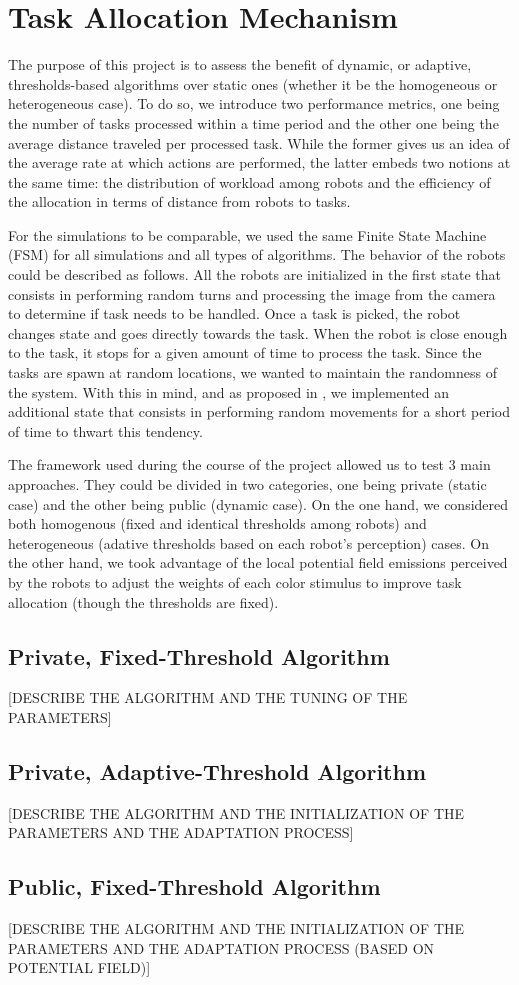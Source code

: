\chapter{Task Allocation Mechanism}
The purpose of this project is to assess the benefit of dynamic, or adaptive, thresholds-based algorithms over static ones (whether it be the homogeneous or heterogeneous case). To do so, we introduce two performance metrics, one being the number of tasks processed within a time period and the other one being the average distance traveled per processed task. While the former gives us an idea of the average rate at which actions are performed, the latter embeds two notions at the same time: the distribution of workload among robots and the efficiency of the allocation in terms of distance from robots to tasks.

For the simulations to be comparable, we used the same Finite State Machine (FSM) for all simulations and all types of algorithms. The behavior of the robots could be described as follows. All the robots are initialized in the first state that consists in performing random turns and processing the image from the camera to determine if task needs to be handled. Once a task is picked, the robot changes state and goes directly towards the task. When the robot is close enough to the task, it stops for a given amount of time to process the task. Since the tasks are spawn at random locations, we wanted to maintain the randomness of the system. With this in mind, and as proposed in \cite{kalra}, we implemented an additional state that consists in performing random movements for a short period of time to thwart this tendency.

The framework used during the course of the project allowed us to test 3 main approaches. They could be divided in two categories, one being private (static case) and the other being public (dynamic case). On the one hand, we considered both homogenous (fixed and identical thresholds among robots) and heterogeneous (adative thresholds based on each robot's perception) cases. On the other hand, we took advantage of the local potential field emissions perceived by the robots to adjust the weights of each color stimulus to improve task allocation (though the thresholds are fixed).

\section{Private, Fixed-Threshold Algorithm}
[DESCRIBE THE ALGORITHM AND THE TUNING OF THE PARAMETERS]
\section{Private, Adaptive-Threshold Algorithm}
[DESCRIBE THE ALGORITHM AND THE INITIALIZATION OF THE PARAMETERS AND THE ADAPTATION PROCESS]
\section{Public, Fixed-Threshold Algorithm}
[DESCRIBE THE ALGORITHM AND THE INITIALIZATION OF THE PARAMETERS AND THE ADAPTATION PROCESS (BASED ON POTENTIAL FIELD)]

